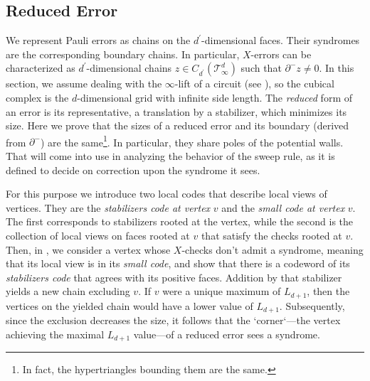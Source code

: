 
\subsection{Reduced Error}
We represent Pauli errors as chains on the $d^{\prime}$-dimensional faces. Their syndromes are the corresponding boundary chains. In particular, $X$-errors can be characterized as $d^{\prime}$-dimensional chains $z \in C_{d^{\prime}}(\mathcal T_\infty^d)$ such that $\partial^{-} z \neq 0$. In this section, we assume dealing with the $\infty$-lift of a circuit (see ), so the cubical complex is the $d$-dimensional grid with infinite side length. The \textit{reduced} form of an error is its representative, a translation by a stabilizer, which minimizes its size. Here we prove that the sizes of a reduced error and its boundary (derived from $\partial^{-}$) are the same\footnote{In fact, the hypertriangles bounding them are the same.}. In particular, they share poles of the potential walls. That will come into use in analyzing the behavior of the sweep rule, as it is defined to decide on correction upon the syndrome it sees.

For this purpose we introduce two local codes that describe local views of vertices. They are the \textit{stabilizers code at vertex} $v$ and the \textit{small code at vertex} $v$. The first corresponds to stabilizers rooted at the vertex, while the second is the collection of local views on faces rooted at $v$ that satisfy the checks rooted at $v$. Then, in , we consider a vertex whose $X$-checks don't admit a syndrome, meaning that its local view is in its \textit{small code}, and show that there is a codeword of its \textit{stabilizers code} that agrees with its positive faces. Addition by that stabilizer yields a new chain excluding $v$. If $v$ were a unique maximum of $L_{d+1}$, then the vertices on the yielded chain would have a lower value of $L_{d+1}$. Subsequently, since the exclusion decreases the size, it follows that the `corner`—the vertex achieving the maximal $L_{d+1}$ value—of a reduced error sees a syndrome.

